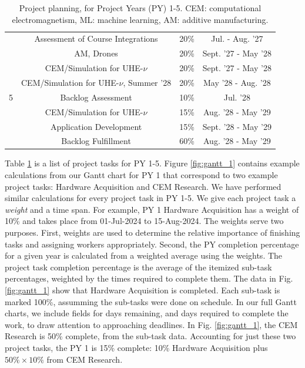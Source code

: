 \documentclass[11pt]{amsart}
\begin{document}
\begin{table}[ht]
\begin{tabular}{c | c | c | c}
 & Assessment of Course Integrations & 20\% & Jul. - Aug. '27 \\
 & AM, Drones & 20\% & Sept. '27 - May '28 \\
 & CEM/Simulation for UHE-$\nu$ & 20\% & Sept. '27 - May '28 \\
 & CEM/Simulation for UHE-$\nu$, Summer '28 & 20\% & May '28 - Aug. '28 \\
\hline
5 & Backlog Assessment & 10\% & Jul. '28 \\
 & CEM/Simulation for UHE-$\nu$ & 15\% & Aug. '28 - May '29 \\
 & Application Development & 15\% & Sept. '28 - May '29 \\
 & Backlog Fulfillment & 60\% & Aug. '28 - May '29 \\ 
\hline
\end{tabular}
\caption{\label{tab:plan} Project planning, for Project Years (PY) 1-5.  CEM: computational electromagnetism, ML: machine learning, AM: additive manufacturing.}
\end{table}

Table \ref{tab:plan} is a list of project tasks for PY 1-5.  Figure \ref{fig:gantt_1} contains example calculations from our Gantt chart for PY 1 that correspond to two example project tasks: Hardware Acquisition and CEM Research.  We have performed similar calculations for every project task in PY 1-5.  We give each project task a \textit{weight} and a time span.  For example, PY 1 Hardware Acquisition has a weight of 10\% and takes place from 01-Jul-2024 to 15-Aug-2024.  The weights serve two purposes.  First, weights are used to determine the relative importance of finishing tasks and assigning workers appropriately.  Second, the PY completion percentage for a given year is calculated from a weighted average using the weights.  The project task completion percentage is the average of the itemized sub-task percentages, weighted by the times required to complete them.  The data in Fig. \ref{fig:gantt_1} show that Hardware Acquisition is completed.  Each sub-task is marked 100\%, assumming the sub-tasks were done on schedule.  In our full Gantt charts, we include fields for days remaining, and days required to complete the work, to draw attention to approaching deadlines.  In Fig. \ref{fig:gantt_1}, the CEM Research is 50\% complete, from the sub-task data.  Accounting for just these two project tasks, the PY 1 is 15\% complete: 10\% Hardware Acquisition plus $50\% \times 10\%$ from CEM Research. 
\end{document}
